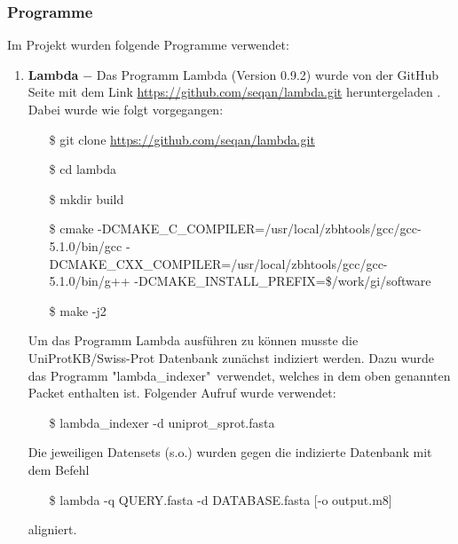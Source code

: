 \documentclass[10pt, a4paper]{article}[08.12.2015]
\begin{document}
      \subsubsection{Programme}
        Im Projekt wurden folgende Programme verwendet:
        
        \begin{enumerate}
          
          \item \textbf{Lambda} $-$ Das Programm Lambda (Version 0.9.2) wurde 			  von der GitHub Seite mit dem Link 											  \url{https://github.com/seqan/lambda.git} heruntergeladen 					  \cite{hauswedell2014}. Dabei wurde wie folgt vorgegangen:
          \begin{itemize}
            \item[\$] git clone \url{https://github.com/seqan/lambda.git}
            \item[\$] cd lambda
            \item[\$] mkdir build
            \item[\$] cmake 																    -DCMAKE\_C\_COMPILER=/usr/local/zbhtools/gcc/gcc-5.1.0/bin/gcc 
            -DCMAKE\_CXX\_COMPILER=/usr/local/zbhtools/gcc/gcc-5.1.0/bin/g++ 
            -DCMAKE\_INSTALL\_PREFIX=\$/work/gi/software 
            \item[\$] make -j2													   
          \end{itemize}
          Um das Programm Lambda ausf\"uhren zu k\"onnen musste die 					  UniProtKB/Swiss-Prot Datenbank zun\"achst indiziert werden. Dazu 				  wurde das Programm "lambda\_indexer"\ verwendet, welches in dem oben 			  genannten Packet enthalten ist. Folgender Aufruf wurde verwendet:
          \begin{itemize}
            \item[\$] lambda\_indexer -d uniprot\_sprot.fasta
          \end{itemize}
          Die jeweiligen Datensets (s.o.) wurden gegen die indizierte Datenbank 
          mit dem Befehl
          \begin{itemize}
            \item[\$] lambda -q QUERY.fasta -d DATABASE.fasta [-o output.m8]
          \end{itemize}
          aligniert.
          

\end{enumerate}
\end{document}
